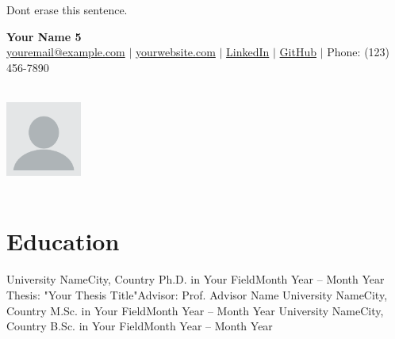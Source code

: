 \label{ResumeFive} %
\thesisspacing %


{\color{white}Dont erase this sentence.}
\medskip



\begin{minipage}{0.7\textwidth}
    \textbf{\Huge Your Name 5} \\[5pt]
    \small \href{mailto:youremail@example.com}{youremail@example.com} $|$ 
    \href{https://yourwebsite.com}{yourwebsite.com} $|$ 
    \href{https://linkedin.com/in/yourprofile}{LinkedIn} $|$ 
    \href{https://github.com/yourprofile}{GitHub} $|$ 
    Phone: (123) 456-7890
\end{minipage}
\begin{minipage}{0.3\textwidth}
    \begin{flushright}
        \includegraphics[width=2.5cm, height=3.5cm]{imgs/your_photo.png} %
    \end{flushright}
\end{minipage}

\section*{Education}
\begin{itemize}[leftmargin=*]
    \resumeEntry
        {University Name}{City, Country}
        {Ph.D. in Your Field}{Month Year – Month Year}
    \resumeSubentry
        {Thesis: "Your Thesis Title"}{Advisor: Prof. Advisor Name}
    \resumeEntry
        {University Name}{City, Country}
        {M.Sc. in Your Field}{Month Year – Month Year}
    \resumeEntry
        {University Name}{City, Country}
        {B.Sc. in Your Field}{Month Year – Month Year}
\end{itemize}


